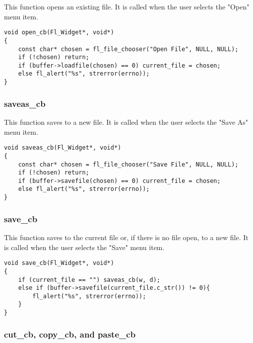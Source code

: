 This function opens an existing file.  It is called when the user selects the
"Open" menu item.

\begin{samepage}
\begin{verbatim}
void open_cb(Fl_Widget*, void*)
{
    const char* chosen = fl_file_chooser("Open File", NULL, NULL);
    if (!chosen) return;
    if (buffer->loadfile(chosen) == 0) current_file = chosen;
    else fl_alert("%s", strerror(errno));
}
\end{verbatim}
\end{samepage}

\subsubsection{saveas\_cb}

This function saves to a new file.  It is called when the user selects the
"Save As" menu item.

\begin{samepage}
\begin{verbatim}
void saveas_cb(Fl_Widget*, void*)
{
    const char* chosen = fl_file_chooser("Save File", NULL, NULL);
    if (!chosen) return;
    if (buffer->savefile(chosen) == 0) current_file = chosen;
    else fl_alert("%s", strerror(errno));
}
\end{verbatim}
\end{samepage}

\subsubsection{save\_cb}

This function saves to the current file or, if there is no file open, to a new
file.  It is called when the user selects the "Save" menu item.

\begin{samepage}
\begin{verbatim}
void save_cb(Fl_Widget*, void*)
{
    if (current_file == "") saveas_cb(w, d);
    else if (buffer->savefile(current_file.c_str()) != 0){
        fl_alert("%s", strerror(errno));
    }
}
\end{verbatim}
\end{samepage}

\subsubsection{cut\_cb, copy\_cb, and paste\_cb}

